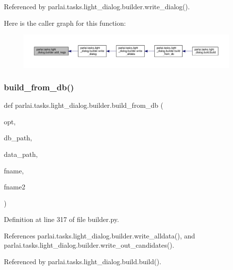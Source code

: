 Referenced by parlai.\+tasks.\+light\+\_\+dialog.\+builder.\+write\+\_\+dialog().

Here is the caller graph for this function\+:
\nopagebreak
\begin{figure}[H]
\begin{center}
\leavevmode
\includegraphics[width=350pt]{namespaceparlai_1_1tasks_1_1light__dialog_1_1builder_a2f5cb4927740a90c9fba84df5e8e16b5_icgraph}
\end{center}
\end{figure}
\mbox{\label{namespaceparlai_1_1tasks_1_1light__dialog_1_1builder_a6a049254e487c29d008f875476ffd76f}} 
\subsubsection{\texorpdfstring{build\+\_\+from\+\_\+db()}{build\_from\_db()}}
{\footnotesize\ttfamily def parlai.\+tasks.\+light\+\_\+dialog.\+builder.\+build\+\_\+from\+\_\+db (\begin{DoxyParamCaption}\item[{}]{opt,  }\item[{}]{db\+\_\+path,  }\item[{}]{data\+\_\+path,  }\item[{}]{fname,  }\item[{}]{fname2 }\end{DoxyParamCaption})}



Definition at line 317 of file builder.\+py.



References parlai.\+tasks.\+light\+\_\+dialog.\+builder.\+write\+\_\+alldata(), and parlai.\+tasks.\+light\+\_\+dialog.\+builder.\+write\+\_\+out\+\_\+candidates().



Referenced by parlai.\+tasks.\+light\+\_\+dialog.\+build.\+build().

